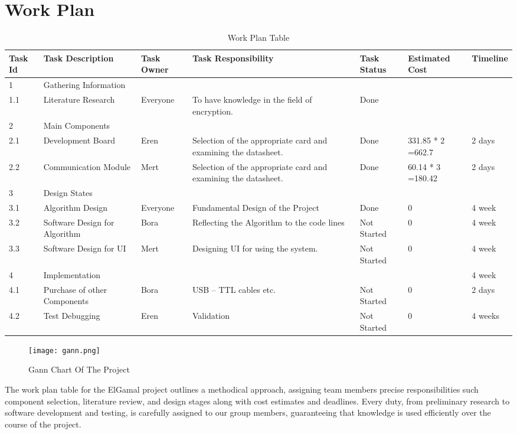 \documentclass[12pt]{article}
\begin{document}
	\section{Work Plan}
	\begin{table}[H]
		
		\renewcommand{\arraystretch}{0.2}
		\centering
		\begin{tabular}{|p{1cm}|p{2.75cm}|p{1.6cm}|p{2.5cm}|p{1.25cm}|p{1.5cm}|p{2cm}|}	\hline
			
			Task Id & Task Description & Task Owner & Task Responsibility & Task Status & Estimated Cost & Timeline \\
			\hline
			
			
			1 & Gathering Information &  &  &  & & \\  \hline
			1.1 & Literature Research & Everyone & To have knowledge in the field of encryption. & Done &  & \\  \hline
			2 & Main Components &  &  &  &  & \\  \hline
			2.1 & Development Board & Eren & Selection of the appropriate card and  examining the datasheet.& Done & 331.85 * 2 =662.7  & 2 days \\  \hline
			2.2 & Communication Module & Mert & Selection of the appropriate card and  examining the datasheet.  & Done  & 60.14 * 3 =180.42  & 2 days  \\  \hline
			3 & Design States &  &  &  &  & \\  \hline
			3.1 & Algorithm Design & Everyone & Fundamental Design of the Project  & Done  & 0  & 4 week  \\  \hline
			3.2 & Software Design for Algorithm & Bora  & Reflecting the Algorithm to the code lines  & Not Started  & 0 & 4 week\\  \hline
			3.3& Software Design for UI & Mert  & Designing UI for using the system. & Not Started  & 0  & 4 week \\  \hline
			4 & Implementation &   &  &   &   & 4 week \\  \hline
			4.1 & Purchase of other Components & Bora  & USB – TTL cables etc.  & Not Started  & 0 & 2 days  \\  \hline
			4.2 & Test Debugging& Eren  & Validation  & Not Started  & 0  & 4 weeks  \\
			\hline
			
		\end{tabular}
		\caption{Work Plan Table}
	\end{table}
	\begin{figure}[H]
		\centering
		\label{gann}
		\texttt{[image: gann.png]}\\[0.5 cm]
		\caption{Gann Chart Of The Project}
	\end{figure}
	The work plan table for the ElGamal project outlines a methodical approach, assigning team members precise responsibilities such component selection, literature review, and design stages along with cost estimates and deadlines. Every duty, from preliminary research to software development and testing, is carefully assigned to our group members, guaranteeing that knowledge is used efficiently over the course of the project.
	
\end{document}
